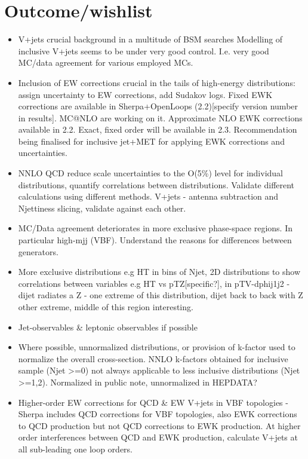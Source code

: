 \documentclass[a4paper,11pt,notoc]{article}
\begin{document}
\section{Outcome/wishlist}
\begin{itemize}
\item V+jets crucial background in a multitude of BSM searches
Modelling of inclusive V+jets seems to be under very good control. I.e. very good MC/data agreement for various employed MCs.
\item Inclusion of EW corrections crucial in the tails of high-energy distributions: assign uncertainty to EW corrections, add Sudakov logs. Fixed EWK corrections are available in Sherpa+OpenLoops (2.2)[specify version number in results]. MC@NLO are working on it. Approximate NLO EWK corrections available in 2.2. Exact, fixed order will be available in 2.3. Recommendation being finalised for inclusive jet+MET for applying EWK corrections and uncertainties.  
\item NNLO QCD reduce scale uncertainties to the O(5\%) level for individual distributions, quantify correlations between distributions. Validate different calculations using different methods. V+jets - antenna subtraction and Njettiness slicing, validate against each other. 
\item MC/Data agreement deteriorates in more exclusive phase-space regions. In particular high-mjj (VBF). Understand the reasons for differences between generators.  
\item More exclusive distributions e.g HT in bins of Njet, 2D distributions to show correlations between variables e.g HT vs pTZ[specific?], in pTV-dphij1j2 - dijet radiates a Z - one extreme of this distribution, dijet back to back with Z other extreme, middle of this region interesting. 
\item Jet-observables \& leptonic observables if possible 
\item Where possible, unnormalized distributions, or provision of k-factor used to normalize the overall cross-section. NNLO k-factors obtained for inclusive sample (Njet >=0) not always applicable to less inclusive distributions (Njet >=1,2). Normalized in public note, unnormalized in HEPDATA?
\item Higher-order EW corrections for QCD \& EW V+jets in VBF topologies - Sherpa includes QCD corrections for VBF topologies, also EWK corrections to QCD production but not QCD corrections to EWK production. At higher order interferences between QCD and EWK production, calculate V+jets at all sub-leading one loop orders.  
\end{itemize}



\end{document}
